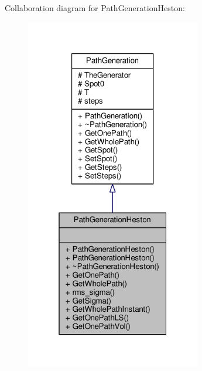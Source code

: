 Collaboration diagram for Path\+Generation\+Heston\+:
\nopagebreak
\begin{figure}[H]
\begin{center}
\leavevmode
\includegraphics[width=217pt]{classPathGenerationHeston__coll__graph}
\end{center}
\end{figure}
